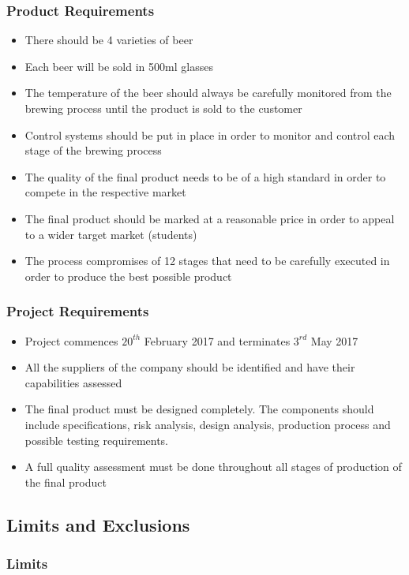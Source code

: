 \subsubsection{Product Requirements}

\begin{itemize}
\item There should be 4 varieties of beer
\item Each beer will be sold in 500ml glasses
\item The temperature of the beer should always be carefully monitored from the brewing process until the product is sold to the customer 
\item Control systems should be put in place in order to monitor and control each stage of the brewing process 
\item The quality of the final product needs to be of a high standard in order to compete in the respective market 
\item The  final product should be marked at a reasonable price in order to appeal to a wider target market (students)
\item The process compromises of 12 stages that need to be carefully executed in order to produce the best possible product 
\end{itemize}
\subsubsection{Project Requirements}

\begin{itemize}
\item Project commences $20^{th}$ February 2017 and terminates $3^{rd}$ May 2017
\item All the suppliers of the company should be identified and have their capabilities assessed 
\item The final product must be designed completely. The components should include specifications, risk analysis, design analysis, production process and possible testing requirements.
\item A full quality assessment must be done throughout all stages of production of the final product
\end{itemize}

\newpage
\subsection{Limits and Exclusions}
\subsubsection{Limits}
